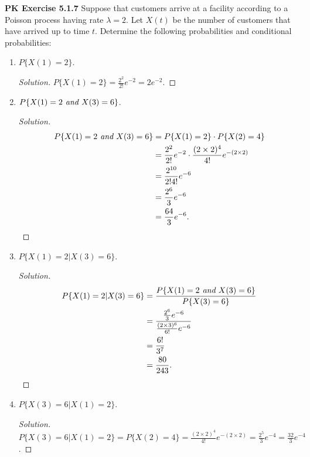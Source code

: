 \documentclass{article}
\begin{document}
\textbf{PK Exercise 5.1.7}
Suppose that customers arrive at a facility according to a Poisson process having rate $\lambda = 2$. 
Let $X(t)$ be the number of customers that have arrived up to time $t$. 
Determine the following probabilities and conditional probabilities:
\begin{enumerate}[label=(\alph*)]
    \item $P\{X(1)=2\}$.
    \begin{proof}[Solution]
        $P\{X(1)=2\} = \frac{2^2}{2!}e^{-2} = 2e^{-2}$.
    \end{proof}

    \item $P\{X(1) = 2 \emph{ and } X(3) = 6\}$.
    \begin{proof}[Solution]
        \begin{align*}
            P\{X(1) = 2 \emph{ and } X(3) = 6\} 
            & = P\{X(1) = 2\}\cdot P\{X(2) = 4\} \\
            & = \frac{2^2}{2!}e^{-2}\cdot\frac{(2\times2)^4}{4!}e^{-(2\times2)} \\
            & = \frac{2^{10}}{2!4!}e^{-6} \\
            & = \frac{2^{6}}{3}e^{-6} \\
            & = \frac{64}{3}e^{-6}.
        \end{align*}
    \end{proof}
    
    \newpage
    \item $P\{X(1) = 2 | X(3) = 6\}$.
    \begin{proof}[Solution]
        \begin{align*}
            P\{X(1) = 2 | X(3) = 6\} & = \frac{P\{X(1) = 2 \emph{ and } X(3) = 6\}}{P\{X(3) = 6\}} \\
            & = \frac{\frac{2^{6}}{3}e^{-6}}{\frac{(2\times3)^6}{6!}e^{-6}} \\
            & = \frac{6!}{3^7} \\
            & = \frac{80}{243}.
        \end{align*}
    \end{proof}

    \item $P\{X(3) = 6 | X(1) = 2\}$.
    \begin{proof}[Solution]
        $P\{X(3) = 6 | X(1) = 2\} = P\{X(2) = 4\} = \frac{(2\times2)^4}{4!}e^{-(2\times2)} = \frac{2^5}{3}e^{-4} = \frac{32}{3}e^{-4}$.
    \end{proof}
\end{enumerate}
\bigbreak
\end{document}
